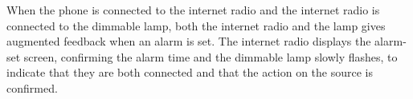 \begin{example}
When the phone is connected to the internet radio and the internet radio is connected to the dimmable lamp, both the internet radio and the lamp gives augmented feedback when an alarm is set. The internet radio displays the alarm-set screen, confirming the alarm time and the dimmable lamp slowly flashes, to indicate that they are both connected and that the action on the source is confirmed.
\end{example}




%
%
%	






